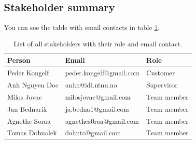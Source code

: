 \subsection{Stakeholder summary}
You can see the table with email contacts in table \ref{tab:stakeholders_summary}.

\begin{table}[!ht]\centering
\caption{List of all stakeholders with their role and email contact. }
\label{tab:stakeholders_summary}
\def\arraystretch{1.15}
\begin{tabular}{lll}
\toprule[1mm]
\textbf{Person} & \textbf{Email} & \textbf{Role}\\
\midrule
Peder Kongelf & peder.kongelf@gmail.com  & Customer\\
\midrule
Anh Nguyen Doc	 & anhn@idi.ntnu.no & Supervisor \\
\midrule
Milos Jovac &  milosjovac@gmail.com & Team member  \\
Jan Bednarik &  ja.bedna1@gmail.com & Team member\\
Agnethe Soraa & agnethes0raa@gmail.com & Team member  \\
Tomas Dohnalek & dohnto@gmail.com & Team member \\
\bottomrule[1mm]

\end{tabular}
\end{table}